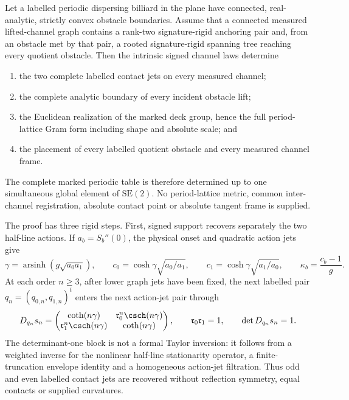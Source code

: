 \begin{theorem}
\label{thm:intro-deterministic-flagship}
Let a labelled periodic dispersing billiard in the plane have connected,
real-analytic, strictly convex obstacle boundaries.  Assume that a connected
measured lifted-channel graph contains a rank-two signature-rigid anchoring
pair and, from an obstacle met by that pair, a rooted signature-rigid spanning
tree reaching every quotient obstacle.  Then the intrinsic signed channel
laws determine
\begin{enumerate}
\item the two complete labelled contact jets on every measured channel;
\item the complete analytic boundary of every incident obstacle lift;
\item the Euclidean realization of the marked deck group, hence the full
period-lattice Gram form including shape and absolute scale; and
\item the placement of every labelled quotient obstacle and every measured
channel frame.
\end{enumerate}
The complete marked periodic table is therefore determined up to one
simultaneous global element of \(\mathrm{SE}(2)\).  No period-lattice metric,
common inter-channel registration, absolute contact point or absolute tangent
frame is supplied.
\end{theorem}

The proof has three rigid steps.  First, signed support recovers separately
the two half-line actions.  If
\(a_b=S_b''(0)\), the physical onset and quadratic action jets give
\begin{equation}\label{eq:intro-v23-leading}
 \gamma=\operatorname{arsinh}(g\sqrt{a_0a_1}),
 \qquad
 c_0=\cosh\gamma\sqrt{a_0/a_1},
 \qquad
 c_1=\cosh\gamma\sqrt{a_1/a_0},
 \qquad
 \kappa_b=\frac{c_b-1}{g}.
\end{equation}
At each order \(n\ge3\), after lower graph jets have been fixed, the next
labelled pair \(q_n=(q_{0,n},q_{1,n})^t\) enters the next action-jet pair
through
\begin{equation}\label{eq:intro-jet-block}
 D_{q_n}s_n=
 \begin{pmatrix}
 \coth(n\gamma)&\mathfrak r_0^n\csch(n\gamma)\\
 \mathfrak r_1^n\csch(n\gamma)&\coth(n\gamma)
 \end{pmatrix},
 \qquad \mathfrak r_0\mathfrak r_1=1,
 \qquad \det D_{q_n}s_n=1.
\end{equation}
The determinant-one block is not a formal Taylor inversion: it follows from a
weighted inverse for the nonlinear half-line stationarity operator, a
finite-truncation envelope identity and a homogeneous action-jet filtration.
Thus odd and even labelled contact jets are recovered without reflection
symmetry, equal contacts or supplied curvatures.

